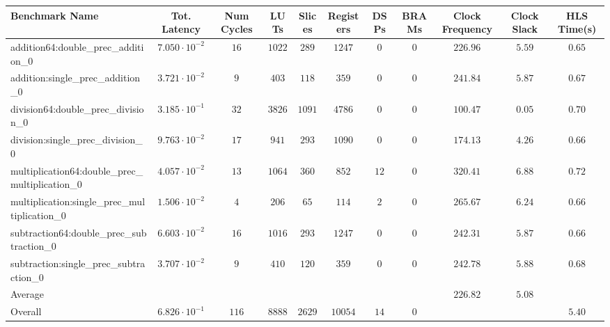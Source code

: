 \begin{tabular}{|l|c|c|c|c|c|c|c|c|c|c|}
\hline
Benchmark Name                                   & Tot. Latency            & Num Cycles & LUTs     & Slices   & Registers & DSPs   & BRAMs & Clock Frequency & Clock Slack & HLS Time(s) \\
\hline
addition64:double\_prec\_addition\_0             & $ 7.050 \cdot 10^{-2} $ & $ 16     $ & $ 1022 $ & $ 289  $ & $ 1247  $ & $ 0  $ & $ 0 $ & $ 226.96      $ & $ 5.59    $ & $ 0.65    $ \\
addition:single\_prec\_addition\_0               & $ 3.721 \cdot 10^{-2} $ & $ 9      $ & $ 403  $ & $ 118  $ & $ 359   $ & $ 0  $ & $ 0 $ & $ 241.84      $ & $ 5.87    $ & $ 0.67    $ \\
division64:double\_prec\_division\_0             & $ 3.185 \cdot 10^{-1} $ & $ 32     $ & $ 3826 $ & $ 1091 $ & $ 4786  $ & $ 0  $ & $ 0 $ & $ 100.47      $ & $ 0.05    $ & $ 0.70    $ \\
division:single\_prec\_division\_0               & $ 9.763 \cdot 10^{-2} $ & $ 17     $ & $ 941  $ & $ 293  $ & $ 1090  $ & $ 0  $ & $ 0 $ & $ 174.13      $ & $ 4.26    $ & $ 0.66    $ \\
multiplication64:double\_prec\_multiplication\_0 & $ 4.057 \cdot 10^{-2} $ & $ 13     $ & $ 1064 $ & $ 360  $ & $ 852   $ & $ 12 $ & $ 0 $ & $ 320.41      $ & $ 6.88    $ & $ 0.72    $ \\
multiplication:single\_prec\_multiplication\_0   & $ 1.506 \cdot 10^{-2} $ & $ 4      $ & $ 206  $ & $ 65   $ & $ 114   $ & $ 2  $ & $ 0 $ & $ 265.67      $ & $ 6.24    $ & $ 0.66    $ \\
subtraction64:double\_prec\_subtraction\_0       & $ 6.603 \cdot 10^{-2} $ & $ 16     $ & $ 1016 $ & $ 293  $ & $ 1247  $ & $ 0  $ & $ 0 $ & $ 242.31      $ & $ 5.87    $ & $ 0.66    $ \\
subtraction:single\_prec\_subtraction\_0         & $ 3.707 \cdot 10^{-2} $ & $ 9      $ & $ 410  $ & $ 120  $ & $ 359   $ & $ 0  $ & $ 0 $ & $ 242.78      $ & $ 5.88    $ & $ 0.68    $ \\
\hline
Average                                          & $                     $ & $        $ & $      $ & $      $ & $       $ & $    $ & $   $ & $ 226.82      $ & $ 5.08    $ & $         $ \\
\hline
Overall                                          & $ 6.826 \cdot 10^{-1} $ & $ 116    $ & $ 8888 $ & $ 2629 $ & $ 10054 $ & $ 14 $ & $ 0 $ & $             $ & $         $ & $ 5.40    $ \\
\hline
\end{tabular}
